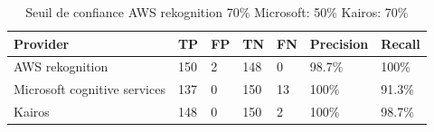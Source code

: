 \begin{table}[H]
\begin{tabular}{|m{2cm} | m{2cm} | m{2cm} | m{2cm} |m{2cm} |m{2cm} |m{2cm}|}
\hline
{\color[HTML]{000000} \textbf{Provider}}              & {\color[HTML]{000000} \textbf{TP}} & {\color[HTML]{000000} \textbf{FP}} & {\color[HTML]{000000} \textbf{TN}} & {\color[HTML]{000000} \textbf{FN}} & {\color[HTML]{000000} \textbf{Precision}} & {\color[HTML]{000000} \textbf{Recall}} \\ \hline
{\color[HTML]{000000} AWS rekognition}                & {\color[HTML]{000000} 150}                    & {\color[HTML]{000000} 2}                       & {\color[HTML]{000000} 148}                    & {\color[HTML]{000000} 0}                       & {\color[HTML]{000000} 98.7\%}                          & {\color[HTML]{000000} 100\%}                        \\ \hline
{\color[HTML]{000000} Microsoft cognitive   services} & {\color[HTML]{000000} 137}                    & {\color[HTML]{000000} 0}                       & {\color[HTML]{000000} 150}                    & {\color[HTML]{000000} 13}                      & {\color[HTML]{000000} 100\%}                           & {\color[HTML]{000000} 91.3\%}                       \\ \hline
{\color[HTML]{000000} Kairos}                         & {\color[HTML]{000000} 148}                    & {\color[HTML]{000000} 0}                       & {\color[HTML]{000000} 150}                    & {\color[HTML]{000000} 2}                       & {\color[HTML]{000000} 100\%}                           & {\color[HTML]{000000} 98.7\%}                       \\ \hline
\end{tabular}
\caption{Seuil de confiance AWS rekognition 70\% Microsoft: 50\% Kairos: 70\%}
\end{table}

